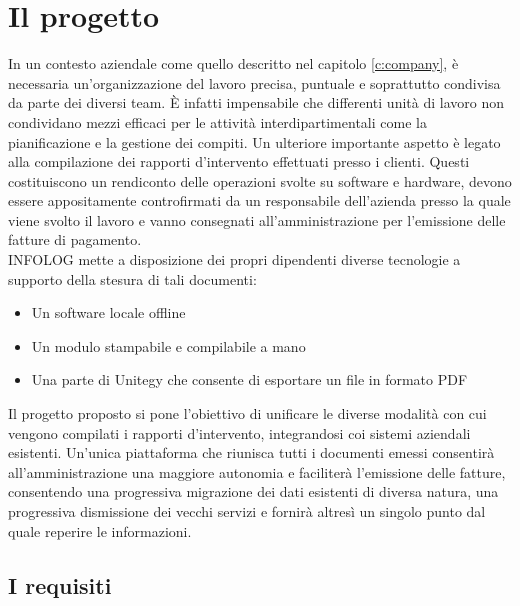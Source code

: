 \chapter{Il progetto}\label{c:project}

In un contesto aziendale come quello descritto nel capitolo \ref{c:company}, è necessaria un'organizzazione del lavoro precisa, puntuale e soprattutto condivisa da parte dei 
diversi team.
È infatti impensabile che differenti unità di lavoro non condividano mezzi efficaci per le attività interdipartimentali come la pianificazione e la gestione dei compiti.
Un ulteriore importante aspetto è legato alla compilazione dei rapporti d'intervento effettuati presso i clienti.
Questi costituiscono un rendiconto delle operazioni svolte su software e hardware, devono essere appositamente controfirmati da un responsabile dell'azienda presso la quale 
viene svolto il lavoro e vanno consegnati all'amministrazione per l'emissione delle fatture di pagamento.
\\
INFOLOG mette a disposizione dei propri dipendenti diverse tecnologie a supporto della stesura di tali documenti:
\begin{itemize}
    \item Un software locale offline
    \item Un modulo stampabile e compilabile a mano
    \item Una parte di Unitegy che consente di esportare un file in formato PDF
\end{itemize}
Il progetto proposto si pone l'obiettivo di unificare le diverse modalità con cui vengono compilati i rapporti d'intervento, integrandosi coi sistemi aziendali esistenti.
Un'unica piattaforma che riunisca tutti i documenti emessi consentirà all'amministrazione una maggiore autonomia e faciliterà l'emissione delle fatture, consentendo una progressiva
migrazione dei dati esistenti di diversa natura, una progressiva dismissione dei vecchi servizi e fornirà altresì un singolo punto dal quale reperire le informazioni.

\section{I requisiti}

